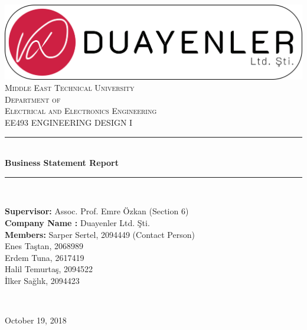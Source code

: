 \documentclass[a4paper,12pt]{article}
\begin{document}
\begin{titlepage}

\newcommand{\HRule}{\rule{\linewidth}{0.5mm}} %
\centering 

\includegraphics[width=\textwidth,height=\textheight,keepaspectratio]{images/logo3-with-stroke}\\[1cm]

\textsc{\LARGE Middle East Technical University}\\[1.5cm] %
\textsc{\Large Department of \\Electrical and Electronics Engineering }\\[0.5cm] %
\textsc{\large EE493 ENGINEERING DESIGN I}\\[0.5cm] %


\HRule \\[0.4cm]
{ \huge \bfseries  Business Statement Report}\\[0cm] %
\HRule \\[1cm]

\begin{minipage}{\textwidth}
\begin{flushleft}
	\large{\textbf{Supervisor\hspace{1.55cm}:}}	Assoc. Prof. Emre Özkan (Section 6)\\
	\large{\textbf{Company Name :}}	Duayenler Ltd. Şti.\\
	\large{\textbf{Members\hspace{1.89cm}:}}
	Sarper Sertel, 2094449 (Contact Person) \\\hspace{4.39cm} 
	Enes Taştan, 2068989 \\\hspace{4.39cm} 
	Erdem Tuna, 2617419 \\\hspace{4.39cm} 
	Halil Temurtaş, 2094522 \\\hspace{4.39cm} 
	İlker Sağlık, 2094423   \\
\end{flushleft}
\end{minipage}\\[1cm]

\begin{flushbottom}
{\large October 19, 2018}\\[1cm] %
\end{flushbottom}

\end{titlepage}
\end{document}
